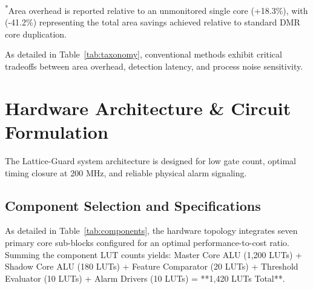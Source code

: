 \documentclass[conference]{IEEEtran}
\begin{document}
\begin{table}[htbp]
\caption{Taxonomy Comparison of Hardware Trojan Mitigation Paradigms}
\label{tab:taxonomy}
\begin{center}
\end{center}
\vspace{2pt}
{\raggedright \scriptsize \textsuperscript{*}Area overhead is reported relative to an unmonitored single core (+18.3\%), with (-41.2\%) representing the total area savings achieved relative to standard DMR core duplication.\par}
\end{table}

As detailed in Table~\ref{tab:taxonomy}, conventional methods exhibit critical tradeoffs between area overhead, detection latency, and process noise sensitivity.

\section{Hardware Architecture \& Circuit Formulation}
The Lattice-Guard system architecture is designed for low gate count, optimal timing closure at 200 MHz, and reliable physical alarm signaling.

\subsection{Component Selection and Specifications}
As detailed in Table~\ref{tab:components}, the hardware topology integrates seven primary core sub-blocks configured for an optimal performance-to-cost ratio. Summing the component LUT counts yields: Master Core ALU (1,200 LUTs) + Shadow Core ALU (180 LUTs) + Feature Comparator (20 LUTs) + Threshold Evaluator (10 LUTs) + Alarm Drivers (10 LUTs) = **1,420 LUTs Total**.
\end{document}
